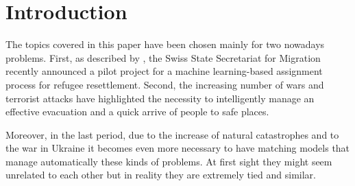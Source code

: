 \section{Introduction}\label{introduction}


The topics covered in this paper have been chosen mainly for two nowadays problems. First, as described by \citet{olbergml}, the Swiss State Secretariat for Migration recently announced a pilot project for a machine learning-based assignment process for refugee resettlement. Second, the increasing number of wars and terrorist attacks have highlighted the necessity to intelligently manage an effective evacuation and a quick arrive of people to safe places.

Moreover, in the last period, due to the increase of natural catastrophes and to the war in Ukraine it becomes even more necessary to have matching models that manage automatically  these kinds of problems. At first sight they might seem unrelated to each other but in reality they are extremely tied and similar.
